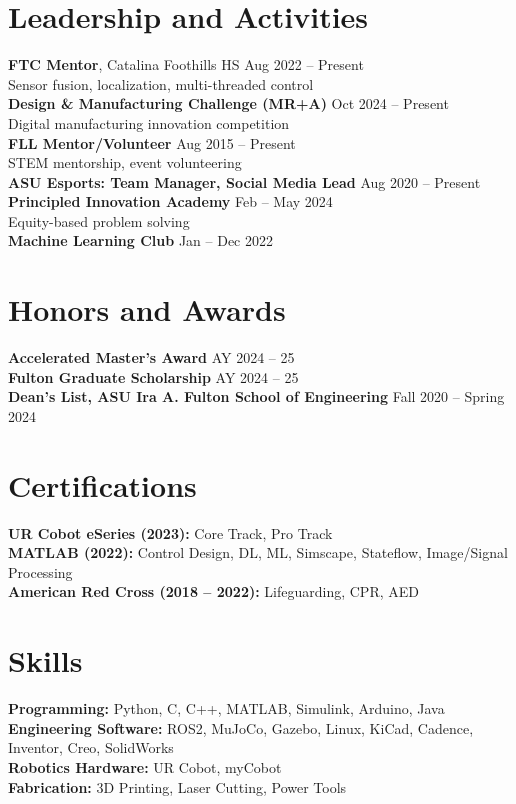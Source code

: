 \documentclass[10pt]{article}
\begin{document}
\section*{Leadership and Activities}
\textbf{FTC Mentor}, Catalina Foothills HS \hfill Aug 2022 -- Present\\
\hspace*{2em}Sensor fusion, localization, multi-threaded control
\\
\textbf{Design \& Manufacturing Challenge (MR+A)} \hfill Oct 2024 -- Present\\
\hspace*{2em}Digital manufacturing innovation competition
\\
\textbf{FLL Mentor/Volunteer} \hfill Aug 2015 -- Present\\
\hspace*{2em}STEM mentorship, event volunteering
\\
\textbf{ASU Esports: Team Manager, Social Media Lead} \hfill Aug 2020 -- Present
\\
\textbf{Principled Innovation Academy} \hfill Feb -- May 2024\\
Equity-based problem solving
\\
\textbf{Machine Learning Club} \hfill Jan -- Dec 2022

\section*{Honors and Awards}
\textbf{Accelerated Master's Award} \hfill AY 2024 -- 25\\
\textbf{Fulton Graduate Scholarship} \hfill AY 2024 -- 25\\
\textbf{Dean's List, ASU Ira A. Fulton School of Engineering} \hfill Fall 2020 -- Spring 2024

\section*{Certifications}
\textbf{UR Cobot eSeries (2023):} Core Track, Pro Track\\
\textbf{MATLAB (2022):} Control Design, DL, ML, Simscape, Stateflow, Image/Signal Processing\\
\textbf{American Red Cross (2018 -- 2022):} Lifeguarding, CPR, AED

\section*{Skills}
\textbf{Programming:} Python, C, C++, MATLAB, Simulink, Arduino, Java\\
\textbf{Engineering Software:} ROS2, MuJoCo, Gazebo, Linux, KiCad, Cadence, Inventor, Creo, SolidWorks\\
\textbf{Robotics Hardware:} UR Cobot, myCobot\\
\textbf{Fabrication:} 3D Printing, Laser Cutting, Power Tools
\end{document}
